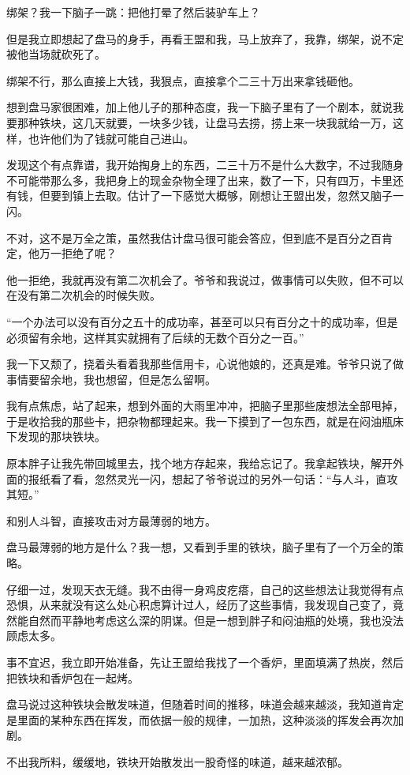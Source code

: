 绑架？我一下脑子一跳：把他打晕了然后装驴车上？

但是我立即想起了盘马的身手，再看王盟和我，马上放弃了，我靠，绑架，说不定被他当场就砍死了。

绑架不行，那么直接上大钱，我狠点，直接拿个二三十万出来拿钱砸他。

想到盘马家很困难，加上他儿子的那种态度，我一下脑子里有了一个剧本，就说我要那种铁块，这几天就要，一块多少钱，让盘马去捞，捞上来一块我就给一万，这样，也许他们为了钱就可能自己进山。

发现这个有点靠谱，我开始掏身上的东西，二三十万不是什么大数字，不过我随身不可能带那么多，我把身上的现金杂物全理了出来，数了一下，只有四万，卡里还有钱，但要到镇上去取。估计了一下感觉大概够，刚想让王盟出发，忽然又脑子一闪。

不对，这不是万全之策，虽然我估计盘马很可能会答应，但到底不是百分之百肯定，他万一拒绝了呢？

他一拒绝，我就再没有第二次机会了。爷爷和我说过，做事情可以失败，但不可以在没有第二次机会的时候失败。

“一个办法可以没有百分之五十的成功率，甚至可以只有百分之十的成功率，但是必须留有余地，这样其实就拥有了后续的无数个百分之一百。”

我一下又颓了，挠着头看着我那些信用卡，心说他娘的，还真是难。爷爷只说了做事情要留余地，我也想留，但是怎么留啊。

我有点焦虑，站了起来，想到外面的大雨里冲冲，把脑子里那些废想法全部甩掉，于是收拾我的那些卡，把杂物都理起来。我一下摸到了一包东西，就是在闷油瓶床下发现的那块铁块。

原本胖子让我先带回城里去，找个地方存起来，我给忘记了。我拿起铁块，解开外面的报纸看了看，忽然灵光一闪，想起了爷爷说过的另外一句话：“与人斗，直攻其短。”

和别人斗智，直接攻击对方最薄弱的地方。

盘马最薄弱的地方是什么？我一想，又看到手里的铁块，脑子里有了一个万全的策略。

仔细一过，发现天衣无缝。我不由得一身鸡皮疙瘩，自己的这些想法让我觉得有点恐惧，从来就没有这么处心积虑算计过人，经历了这些事情，我发现自己变了，竟然能自然而平静地考虑这么深的阴谋。但是一想到胖子和闷油瓶的处境，我也没法顾虑太多。

事不宜迟，我立即开始准备，先让王盟给我找了一个香炉，里面填满了热炭，然后把铁块和香炉包在一起烤。

盘马说过这种铁块会散发味道，但随着时间的推移，味道会越来越淡，我知道肯定是里面的某种东西在挥发，而依据一般的规律，一加热，这种淡淡的挥发会再次加剧。

不出我所料，缓缓地，铁块开始散发出一股奇怪的味道，越来越浓郁。

